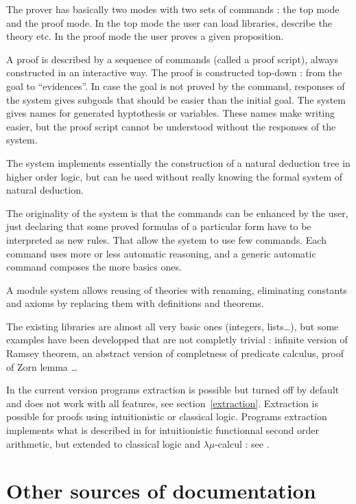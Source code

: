 The prover has basically two modes with two sets of commands : the top
mode and the proof mode. In the top mode the user can load libraries,
describe the theory etc. In the proof mode the user proves a given
proposition.

A proof is described by a sequence of commands (called a proof
script), always constructed in an interactive way. The proof is
constructed top-down : from the goal to ``evidences''.  In case the
goal is not proved by the command, responses of the system gives
subgoals that should be easier than the initial goal.  The system
gives names for generated hyptothesis or variables. These names make
writing easier, but the proof script cannot be understood without the
responses of the system.

The system implements essentially the construction of a natural
deduction tree in higher order logic, but can be used without really
knowing the formal system of natural deduction.

The originality of the system is that the commands can be enhanced by
the user, just declaring that some proved formulas of a particular form
have to be interpreted as new rules.
That allow the system to use few commands. Each command uses more or
less automatic reasoning, and a generic automatic command composes
the more basics ones.

A module system allows reusing of theories with renaming, eliminating
constants and axioms by replacing them with definitions and theorems.

The existing libraries are almost all very basic ones (integers,
lists\dots), but some examples have been developped that are not
completly trivial : infinite version of Ramsey theorem, an abstract
version of completness of predicate calculus, proof of Zorn lemma \dots




In the current version programs extraction is possible but turned off by
default and does not work with all features, see
section~\ref{extraction}.  Extraction is possible for proofs using
  intuitionistic or classical logic.  Programs extraction implements
  what is described in \cite{Kri90} for intuitionistic functionnal second
  order arithmetic, but extended to classical logic and
  $\lambda\mu$-calcul : see \cite{Par92}.

\section{Other sources of documentation}

